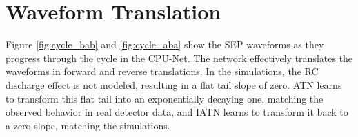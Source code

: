 

\section{Waveform Translation}
Figure \ref{fig:cycle_bab} and \ref{fig:cycle_aba} show the SEP waveforms as they progress through the cycle in the CPU-Net. The network effectively translates the waveforms in forward and reverse translations. In the {\siggen} simulations, the RC discharge effect is not modeled, resulting in a flat tail slope of zero. ATN learns to transform this flat tail into an exponentially decaying one, matching the observed behavior in real detector data, and IATN learns to transform it back to a zero slope, matching the simulations.



